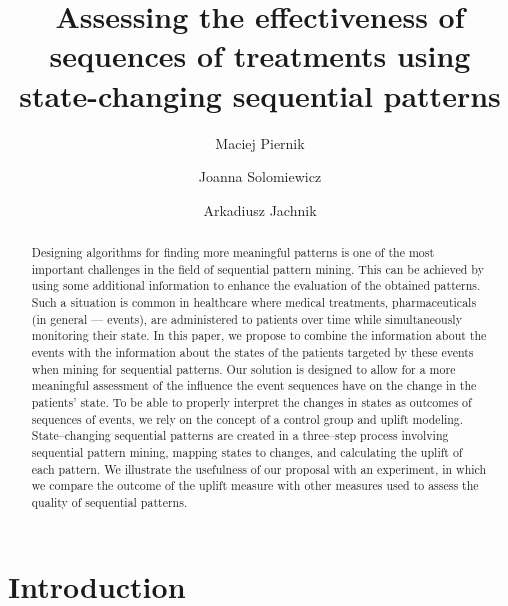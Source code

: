 \documentclass[runningheads,a4paper]{llncs}
\begin{document}
\mainmatter

\title{Assessing the effectiveness of sequences of treatments using state-changing sequential patterns}


\author{Maciej Piernik \and Joanna Solomiewicz \and Arkadiusz Jachnik}



\maketitle

\begin{abstract}
Designing algorithms for finding more meaningful patterns is one of the most important challenges in the field of sequential pattern mining.
This can be achieved by using some additional information to enhance the evaluation of the obtained patterns.
Such a situation is common in healthcare where medical treatments, pharmaceuticals (in general --- events), are administered to patients over time while simultaneously monitoring their state.
In this paper, we propose to combine the information about the events with the information about the states of the patients targeted by these events when mining for sequential patterns.
Our solution is designed to allow for a more meaningful assessment of the influence the event sequences have on the change in the patients' state.
To be able to properly interpret the changes in states as outcomes of sequences of events, we rely on the concept of a control group and uplift modeling.
State--changing sequential patterns are created in a three--step process involving sequential pattern mining, mapping states to changes, and calculating the uplift of each pattern.
We illustrate the usefulness of our proposal with an experiment, in which we compare the outcome of the uplift measure with other measures used to assess the quality of sequential patterns.
\end{abstract}

\section{Introduction}
\label{sec:introduction}
\end{document}
